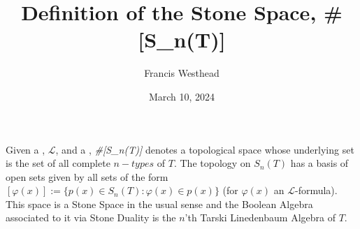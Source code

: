 \documentclass[a4paper]{article}
\title{Definition of the Stone Space, #[S_n(T)]}
\date{March 10, 2024}
\author{Francis Westhead}
\begin{document}
\maketitle
\par{Given a , \(\mathcal {L}\), and a , \emph{#[S_n(T)]} denotes a topological space whose underlying set is the set of all complete \(n-types\) of \(T\). The topology on \(S_n(T)\) has a basis of open sets given by all sets of the form \([ \varphi (x)] :=  \{ p(x) \in  S_n(T):  \varphi (x)  \in  p(x) \}\) (for \(\varphi (x)\) an \(\mathcal {L}\)-formula). This space is a Stone Space in the usual sense and the Boolean Algebra associated to it via Stone Duality is the \(n\)'th Tarski Linedenbaum Algebra of \(T\).}
\printbibliography
\end{document}
